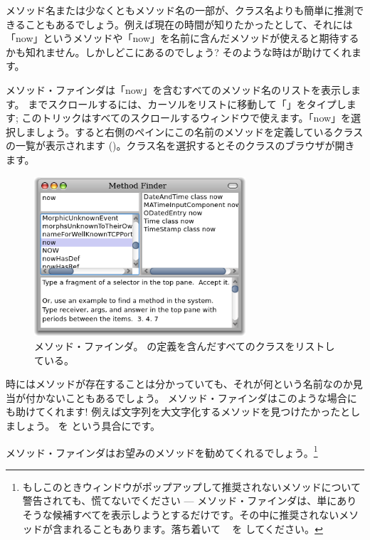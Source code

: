 \documentclass[a4paper,10pt,twoside]{book}
\begin{document}
メソッド名または少なくともメソッド名の一部が、クラス名よりも簡単に推測できることもあるでしょう。例えば現在の時間が知りたかったとして、それには「now」というメソッドや「now」を名前に含んだメソッドが使えると期待するかも知れません。しかしどこにあるのでしょう?
そのような時はが助けてくれます。

メソッド・ファインダは「now」を含むすべてのメソッド名のリストを表示します。
 までスクロールするには、カーソルをリストに移動して「」をタイプします; このトリックはすべてのスクロールするウィンドウで使えます。「now」を選択しましょう。すると右側のペインにこの名前のメソッドを定義しているクラスの一覧が表示されます ()。クラス名を選択するとそのクラスのブラウザが開きます。

\begin{figure}[hbt]
\centerline {\includegraphics[width=0.7\textwidth]{methodFinder-now}}
\caption{メソッド・ファインダ。 の定義を含んだすべてのクラスをリストしている。
}
\end{figure}

時にはメソッドが存在することは分かっていても、それが何という名前なのか見当が付かないこともあるでしょう。
メソッド・ファインダはこのような場合にも助けてくれます! 例えば文字列を大文字化するメソッドを見つけたかったとしましょう。 を  という具合にです。

\noindent
メソッド・ファインダはお望みのメソッドを勧めてくれるでしょう。\footnote{もしこのときウィンドウがポップアップして推奨されないメソッドについて警告されても、慌てないでください --- メソッド・ファインダは、単にありそうな候補すべてを表示しようとするだけです。その中に推奨されないメソッドが含まれることもあります。落ち着いて ~ を \click してください。}
\end{document}
